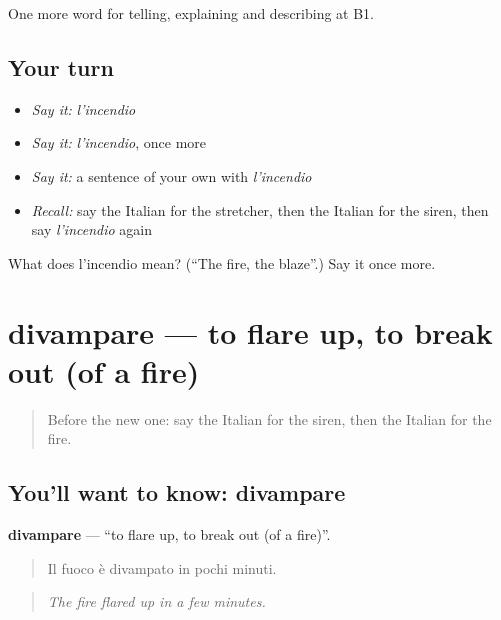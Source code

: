 \begin{grammarlens}[title={What you've built}]
One more word for telling, explaining and describing at B1.
\end{grammarlens}

\subsection*{Your turn}
\begin{itemize}
\raggedright
  \item \emph{Say it:} \emph{l'incendio}
  \item \emph{Say it:} \emph{l'incendio}, once more
  \item \emph{Say it:} a sentence of your own with \emph{l'incendio}
  \item \emph{Recall:} say the Italian for the stretcher, then the Italian for the siren, then say \emph{l'incendio} again
\end{itemize}

\begin{tcolorbox}[breakable,colback=teal!4,colframe=teal!35!black,title={Before you move on}]
What does l'incendio mean? (\textquotedblleft{}The fire, the blaze\textquotedblright{}.) Say it once more.
\end{tcolorbox}
\section[divampare]{divampare — to flare up, to break out (of a fire)}

\label{lesson:IT-C302-divampare}



\begin{quote}
Before the new one: say the Italian for the siren, then the Italian for the fire.
\end{quote}

\subsection*{You'll want to know: divampare}
\textbf{divampare} — \textquotedblleft{}to flare up, to break out (of a fire)\textquotedblright{}.

\begin{quote}
Il fuoco è divampato in pochi minuti.
\end{quote}

\begin{quote}
\emph{The fire flared up in a few minutes.}
\end{quote}

